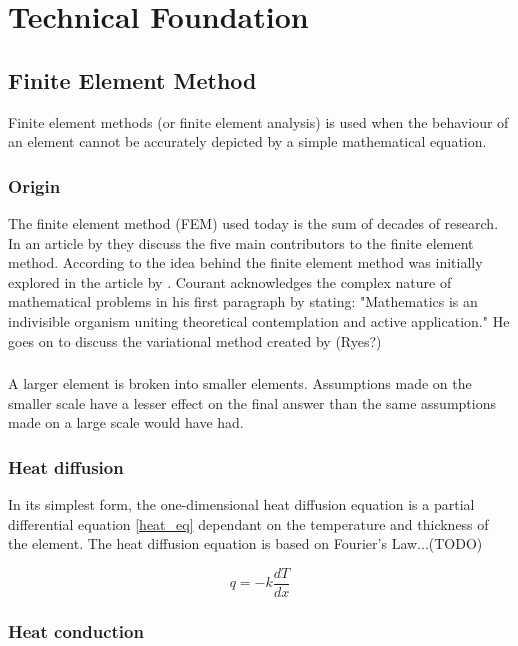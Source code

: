 \chapter{Technical Foundation} \label{tech}
\section{Finite Element Method}
Finite element methods (or finite element analysis) is used when the behaviour of an element cannot be accurately depicted by a simple mathematical equation. 
	\subsection{Origin}
	The finite element method (FEM) used today is the sum of decades of research. 
	In an article by \citeauthor{Gupta:1996} they discuss the five main contributors to the finite element method. 
	According to \citet{Gupta:1996} the idea behind the finite element method was initially explored in the \citeyear{Courant:1943} article by \citeauthor{Courant:1943}. 
	Courant acknowledges the complex nature of mathematical problems in his first paragraph by stating: "Mathematics is an indivisible organism uniting theoretical contemplation and active application."
	He goes on to discuss the variational method created by (Ryes?)
	
	
	
	\subsection{}
	A larger element is broken into smaller elements. 
	Assumptions made on the smaller scale have a lesser effect on the final answer than the same assumptions made on a large scale would have had.


	\subsection{Heat diffusion}	 
	 In its simplest form, the one-dimensional heat diffusion equation is a partial differential equation \ref{heat_eq} dependant on the temperature and thickness of the element. 
	The heat diffusion equation is based on Fourier's Law...(TODO)
	
	
	\begin{equation}
	\label{heat_eq}
		q = -k \frac{dT}{dx}
	\end{equation}
	\subsection{Heat conduction}
	

